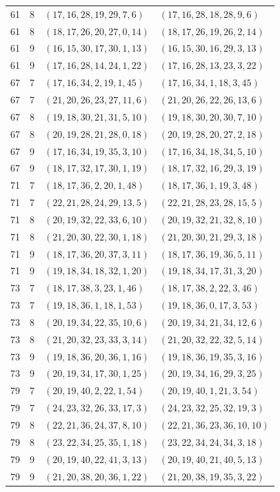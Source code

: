 \documentclass[11pt,a4paper]{article}
\theoremstyle{definition}
\numberwithin{equation}{section}
\begin{document}
\begin{longtable}{rrll}
61&8&$(17,16,28,19,29,7,6)$&$(17,16,28,18,28,9,6)$\\
61&8&$(18,17,26,20,27,0,14)$&$(18,17,26,19,26,2,14)$\\
61&9&$(16,15,30,17,30,1,13)$&$(16,15,30,16,29,3,13)$\\
61&9&$(17,16,28,14,24,1,22)$&$(17,16,28,13,23,3,22)$\\
67&7&$(17,16,34,2,19,1,45)$&$(17,16,34,1,18,3,45)$\\
67&7&$(21,20,26,23,27,11,6)$&$(21,20,26,22,26,13,6)$\\
67&8&$(19,18,30,21,31,5,10)$&$(19,18,30,20,30,7,10)$\\
67&8&$(20,19,28,21,28,0,18)$&$(20,19,28,20,27,2,18)$\\
67&9&$(17,16,34,19,35,3,10)$&$(17,16,34,18,34,5,10)$\\
67&9&$(18,17,32,17,30,1,19)$&$(18,17,32,16,29,3,19)$\\
71&7&$(18,17,36,2,20,1,48)$&$(18,17,36,1,19,3,48)$\\
71&7&$(22,21,28,24,29,13,5)$&$(22,21,28,23,28,15,5)$\\
71&8&$(20,19,32,22,33,6,10)$&$(20,19,32,21,32,8,10)$\\
71&8&$(21,20,30,22,30,1,18)$&$(21,20,30,21,29,3,18)$\\
71&9&$(18,17,36,20,37,3,11)$&$(18,17,36,19,36,5,11)$\\
71&9&$(19,18,34,18,32,1,20)$&$(19,18,34,17,31,3,20)$\\
73&7&$(18,17,38,3,23,1,46)$&$(18,17,38,2,22,3,46)$\\
73&7&$(19,18,36,1,18,1,53)$&$(19,18,36,0,17,3,53)$\\
73&8&$(20,19,34,22,35,10,6)$&$(20,19,34,21,34,12,6)$\\
73&8&$(21,20,32,23,33,3,14)$&$(21,20,32,22,32,5,14)$\\
73&9&$(19,18,36,20,36,1,16)$&$(19,18,36,19,35,3,16)$\\
73&9&$(20,19,34,17,30,1,25)$&$(20,19,34,16,29,3,25)$\\
79&7&$(20,19,40,2,22,1,54)$&$(20,19,40,1,21,3,54)$\\
79&7&$(24,23,32,26,33,17,3)$&$(24,23,32,25,32,19,3)$\\
79&8&$(22,21,36,24,37,8,10)$&$(22,21,36,23,36,10,10)$\\
79&8&$(23,22,34,25,35,1,18)$&$(23,22,34,24,34,3,18)$\\
79&9&$(20,19,40,22,41,3,13)$&$(20,19,40,21,40,5,13)$\\
79&9&$(21,20,38,20,36,1,22)$&$(21,20,38,19,35,3,22)$\\
\bottomrule\end{longtable}
\endgroup
\end{document}

